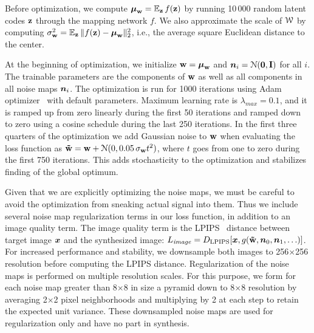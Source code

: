Before optimization, we compute $\boldsymbol{\mu}_{\bf w} = \mathbb{E}_{\bf z}\,f({\bf z})$ by running 10\,000 random latent codes ${\bf z}$ through the mapping network $f$.
We also approximate the scale of $\mathcal{W}$ by computing $\sigma^2_{\bf w} = \mathbb{E}_{\bf z}\,\lVert f({\bf z})-\boldsymbol{\mu}_{\bf w}\rVert^2_2$, i.e., the average square Euclidean distance to the center.

At the beginning of optimization, we initialize ${\bf w} = \boldsymbol{\mu}_{\bf w}$ and $\boldsymbol{n}_i = \mathcal{N}(\boldsymbol{0}, \mathbf{I})$ for all $i$. 
The trainable parameters are the components of ${\bf w}$ as well as all components in all noise maps $\boldsymbol{n}_i$.
The optimization is run for 1000 iterations using Adam optimizer~\cite{adam} with default parameters.
Maximum learning rate is $\lambda_\mathit{max}=0.1$, and it is ramped up from zero linearly during the first 50 iterations and ramped down to zero using a cosine schedule during the last 250 iterations.
In the first three quarters of the optimization we add Gaussian noise to ${\bf w}$ when evaluating the loss function 
as ${\bf\tilde w} = {\bf w} + \mathcal{N}(0, 0.05\,\sigma_{\bf w} t^2)$, where $t$ goes from one to zero during the first 750 iterations.
This adds stochasticity to the optimization and stabilizes finding of the global optimum.

Given that we are explicitly optimizing the noise maps, we must be careful to avoid the optimization from sneaking actual signal into them.
Thus we include several noise map regularization terms in our loss function, in addition to an image quality term. 
The image quality term is the LPIPS~\cite{Zhang2018metric} distance between target image $\boldsymbol{x}$ and the synthesized image:
$L_\mathit{image}=D_\mathrm{LPIPS}[\boldsymbol{x}, g({\bf\tilde w}, \boldsymbol{n}_0, \boldsymbol{n}_1, \ldots)]$.
For increased performance and stability, we downsample both images to 256$\times$256 resolution before computing the LPIPS distance.
Regularization of the noise maps is performed on multiple resolution scales.
For this purpose, we form for each noise map greater than 8$\times$8 in size a pyramid down to 8$\times$8 resolution by averaging 2$\times$2 pixel neighborhoods and multiplying by 2 at each step to retain the expected unit variance. 
These downsampled noise maps are used for regularization only and have no part in synthesis.

